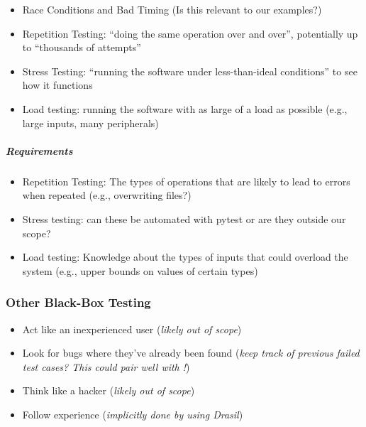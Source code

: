 \begin{itemize}
      \item Race Conditions and Bad Timing \citep[pp.~85-86]{Patton2006}
            (Is this relevant to our examples?)
      \item Repetition Testing: ``doing the same operation over and over'',
            potentially up to ``thousands of attempts''
            \citep[p.~86]{Patton2006}
      \item Stress Testing: ``running the software under less-than-ideal
            conditions'' to see how it functions \citep[p.~86]{Patton2006}
      \item Load testing: running the software with as large of a load as
            possible (e.g., large inputs, many peripherals)
            \citep[p.~86]{Patton2006}
\end{itemize}

\subparagraph{Requirements}
\begin{itemize}
      \item Repetition Testing: The types of operations that are likely to lead
            to errors when repeated (e.g., overwriting files?)
      \item Stress testing: can these be automated with pytest or are they
            outside our scope? 
      \item Load testing: Knowledge about the types of inputs that could
            overload the system (e.g., upper bounds on values of certain types)
\end{itemize}

\subsubsection{Other Black-Box Testing \citep[pp.~87-89]{Patton2006}}
\begin{itemize}
      \item Act like an inexperienced user (\emph{likely out of scope})
      \item Look for bugs where they've already been found (\emph{keep track of
                  previous failed test cases? This could pair well with
                  !})
      \item Think like a hacker (\emph{likely out of scope})
      \item Follow experience (\emph{implicitly done by using Drasil})
\end{itemize}

